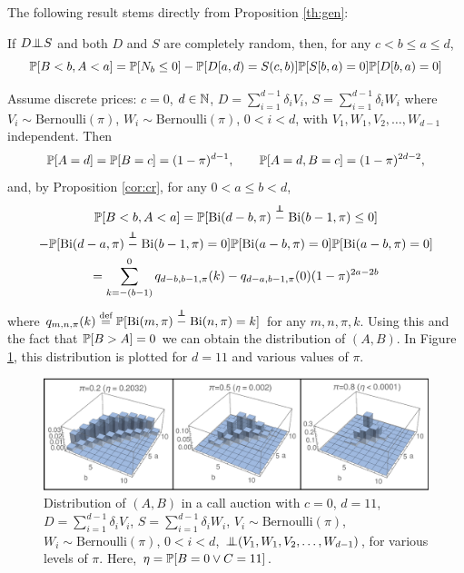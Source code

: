 \documentclass{aptpub}
\begin{document}
The following result stems directly from Proposition \ref{th:gen}:

\begin{proposition}
\label{cor:cr} If $D \indep S$ and both $D$ and $S$ are completely random, then, for any $c < b \leq a \leq d$,
$$\P[B<b,A<a] = \P[N_b\leq 0]-\P[D[a,d)=S(c,b)]\P[S[b,a)=0]\P[D[b,a)=0]$$
\end{proposition}

\begin{example} Assume discrete prices: $c=0$, $d \in \N$, $D=\sum_{i=1}^{d-1} \delta_i V_i$, 
$S=\sum_{i=1}^{d-1} \delta_i W_i$ where $V_i \sim \mathrm{Bernoulli}(\pi)$, $W_i \sim \mathrm{Bernoulli}(\pi)$, $0 < i < d$, with $V_1,W_1,V_2,\dots,W_{d-1}$ independent. Then
$$
\P[A=d]=\P[B=c]=(1-\pi)^{d-1}, \qquad  \P[A=d, B=c]=(1-\pi)^{2d-2},
$$
and, by Proposition \ref{cor:cr}, for any $0 < a \leq b < d$,
\begin{multline*}
\P[B< b, A < a]
=
\P[\Bi(d-b,\pi)\stackrel{\indep{}}-\Bi(b-1,\pi)\leq 0] \\ -\P[\Bi(d-a,\pi)\stackrel{\indep{}}-\Bi(b-1,\pi)=0]
\P[\Bi(a-b,\pi)=0]\P[\Bi(a-b,\pi)=0] \\
= \sum_{k=-(b-1)}^0 q_{d-b,b-1,\pi}(k)-q_{d-a,b-1,\pi}(0)(1-\pi)^{2a-2b}
\end{multline*}
where $q_{m,n,\pi}(k) \defined \P[\Bi(m,\pi)\stackrel{\indep{}}-\Bi(n,\pi)=k]$ for any $m,n,\pi,k$. Using this and the fact that $\P[B>A]=0$ we can obtain the distribution of $(A,B)$. In Figure \ref{fig:bin}, this distribution is plotted for $d=11$ and various values of $\pi$.
\end{example}

\begin{figure}
\begin{center}
\includegraphics[width=\textwidth]{binom.pdf}
\caption{Distribution of $(A,B)$ in a call auction with $c=0$, $d = 11$, $D=\sum_{i=1}^{d-1} \delta_i V_i$, 
$S=\sum_{i=1}^{d-1} \delta_i W_i$, $V_i \sim \mathrm{Bernoulli}(\pi)$, $W_i \sim \mathrm{Bernoulli}(\pi)$, $0 < i < d$, $\indep(V_1,W_1,V_2,\dots,W_{d-1})$, for various levels of $\pi$. Here, $\eta = \P[B = 0 \vee C = 11]$.}
\label{fig:bin}
\end{center}
\end{figure}
\end{document}
